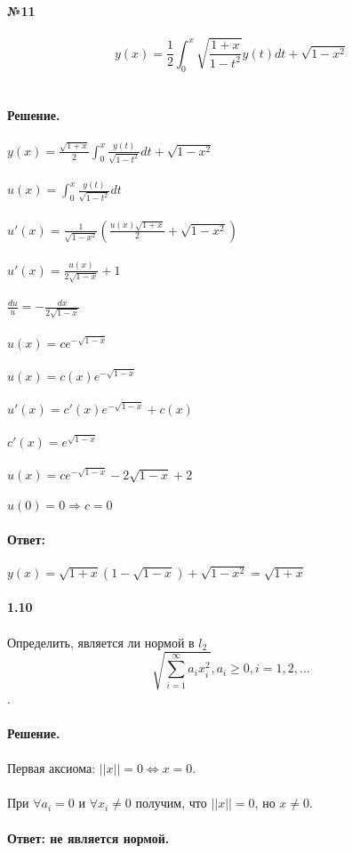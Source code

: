\documentclass[10pt,a4paper]{article}
\begin{document}
	\noindent\textbf{№11} \\ \\
	$$y(x)=\frac{1}{2}\int_{0}^{x}\sqrt{\frac{1+x}{1-t^2}}y(t)dt+\sqrt{1-x^2}$$\\ \\
	\textbf{Решение.} \\ \\
	$y(x)=\frac{\sqrt{1+x}}{2}\int_{0}^{x}\frac{y(t)}{\sqrt{1-t^2}}dt+\sqrt{1-x^2}$\\ \\
	$u(x)=\int_{0}^{x}\frac{y(t)}{\sqrt{1-t^2}}dt$\\ \\
	$u'(x)=\frac{1}{\sqrt{1-x^2}}(\frac{u(x)\sqrt{1+x}}{2}+\sqrt{1-x^2})$\\ \\
	$u'(x)=\frac{u(x)}{2\sqrt{1-x}}+1$ \\ \\
	$\frac{du}{u}=-\frac{dx}{2\sqrt{1-x}}$\\ \\
	$u(x)=ce^{-\sqrt{1-x}}$ \\ \\
	$u(x)=c(x)e^{-\sqrt{1-x}}$\\ \\
	$u'(x)=c'(x)e^{-\sqrt{1-x}}+c(x)$\\ \\
	$c'(x)=e^{\sqrt{1-x}}$\\ \\
	$u(x)=ce^{-\sqrt{1-x}}-2\sqrt{1-x}+2$\\ \\
	$u(0)=0 \Rightarrow c=0$\\ \\
	\textbf{Ответ:} \\ \\
	$y(x)=\sqrt{1+x}(1-\sqrt{1-x})+\sqrt{1-x^2}=\sqrt{1+x}$\\ \\
	
	\noindent\textbf{1.10} \\  \\
	Определить, является ли нормой в $l_2$ $$\sqrt{\sum_{i = 1}^{\infty} a_ix_i^2},a_i \ge 0, i = 1, 2, \dots$$. \\ \\
	\textbf{Решение.} \\ \\
	Первая аксиома:
	$ ||x|| = 0 \Leftrightarrow x = 0$. \\ \\
	При $\forall a_i = 0$ и $\forall x_i \ne 0$ получим, что $||x|| = 0$, но $x \ne 0$. \\ \\
	\textbf{Ответ: не является нормой.} \\ \\
	
\end{document}

